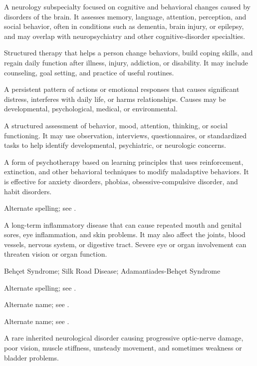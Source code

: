  A neurology subspecialty focused on cognitive and behavioral changes caused by
disorders of the brain. It assesses memory, language, attention, perception, and social
behavior, often in conditions such as dementia, brain injury, or epilepsy, and may
overlap with neuropsychiatry and other cognitive-disorder specialties.

 Structured therapy that helps a person change behaviors, build coping skills, and regain daily function after illness, injury, addiction, or disability. It may include counseling, goal setting, and practice of useful routines.

 A persistent pattern of actions or emotional responses that causes significant distress, interferes with daily life, or harms relationships. Causes may be developmental, psychological, medical, or environmental.

 A structured assessment of behavior, mood, attention, thinking, or social functioning. It may use observation, interviews, questionnaires, or standardized tasks to help identify developmental, psychiatric, or neurologic concerns.

 A form of psychotherapy based on learning principles that uses reinforcement, extinction, and other behavioral techniques to modify maladaptive behaviors. It is effective for anxiety disorders, phobias, obsessive-compulsive disorder, and habit disorders.

 Alternate spelling; see .

 A long-term inflammatory disease that can cause
repeated mouth and genital sores, eye inflammation, and skin problems. It may
also affect the joints, blood vessels, nervous system, or digestive tract.
Severe eye or organ involvement can threaten vision or organ function.

\synonyms
Behçet Syndrome; Silk Road Disease; Adamantiades-Behçet Syndrome

 Alternate spelling; see .

 Alternate name; see .

 Alternate name; see .

 A rare inherited neurological disorder causing progressive optic-nerve damage, poor vision, muscle stiffness, unsteady movement, and sometimes weakness or bladder problems.

